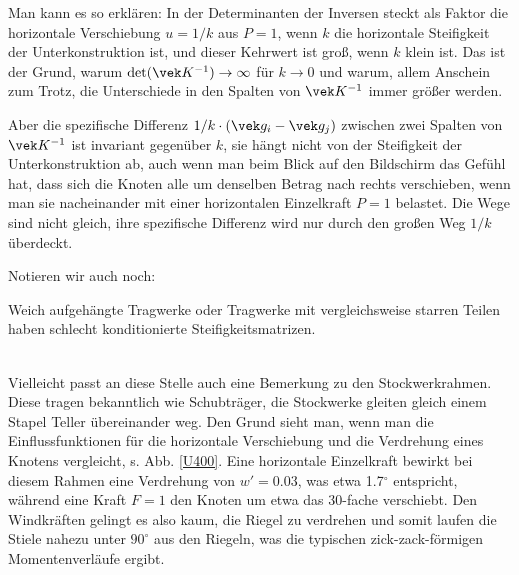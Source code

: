 {{Man kann es so erkl\"{a}ren: In der Determinanten der Inversen steckt als Faktor die horizontale Verschiebung $u = 1/k$ aus $P = 1$, wenn $k$ die horizontale Steifigkeit der Unterkonstruktion ist, und dieser Kehrwert ist gro{\ss}, wenn $k$ klein ist. Das ist der Grund, warum $\det(\vek K^{-1}) \to \infty$ f\"{u}r $k \to 0$ und warum, allem Anschein zum Trotz, die Unterschiede in den Spalten von $\vek K^{-1}$ immer gr\"{o}{\ss}er werden.

Aber die spezifische Differenz $1/k \cdot(\vek g_i - \vek g_j)$ zwischen zwei Spalten von $\vek K^{-1}$ ist invariant gegen\"{u}ber $k$, sie h\"{a}ngt nicht von der Steifigkeit der Unterkonstruktion ab, auch wenn man beim Blick auf den Bildschirm das Gef\"{u}hl hat, dass sich die Knoten alle um denselben Betrag nach rechts verschieben, wenn man sie nacheinander mit einer horizontalen Einzelkraft $P = 1$ belastet. Die Wege sind nicht gleich, ihre spezifische Differenz wird nur durch den gro{\ss}en Weg $1/k$ \"{u}berdeckt.

Notieren wir auch noch:\\

\hspace*{-12pt}\colorbox{hellgrau}{\parbox{0.98\textwidth}{
Weich aufgeh\"{a}ngte Tragwerke oder Tragwerke mit vergleichsweise starren Teilen haben schlecht konditionierte Steifigkeitsmatrizen.}}\\

Vielleicht passt an diese Stelle auch eine Bemerkung zu den Stockwerk\-rahmen. Diese tragen bekanntlich wie Schubtr\"{a}ger, die Stockwerke gleiten gleich einem Stapel Teller \"{u}bereinander weg. Den Grund sieht man, wenn man die Einflussfunktionen f\"{u}r die horizontale Verschiebung und die Verdrehung eines Knotens vergleicht, s. Abb. \ref{U400}. Eine horizontale Einzelkraft bewirkt bei diesem Rahmen eine Verdrehung von $w' = 0.03 $, was etwa 1.7$^\circ$ entspricht, w\"{a}hrend eine Kraft $F = 1$ den Knoten um etwa das 30-fache verschiebt. Den Windkr\"{a}ften gelingt es also kaum, die Riegel zu verdrehen und somit laufen die Stiele nahezu unter $90^\circ$ aus den Riegeln, was die typischen zick-zack-f\"{o}rmigen Momentenverl\"{a}ufe ergibt.



}}
